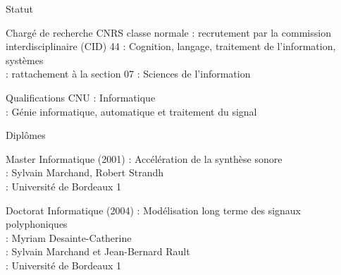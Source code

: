 \begin{frame}{Statut}
\begin{block}{Chargé de recherche CNRS classe normale}
 : recrutement par la commission interdisciplinaire (CID) 44 : \og Cognition, langage, traitement de l’information, systèmes \fg \\
 : rattachement à la section 07 : \og Sciences de l'information \fg
\end{block}
\begin{block}{Qualifications CNU}
 : \og Informatique \fg \\
 : \og Génie informatique, automatique et traitement du signal \fg
\end{block}
\end{frame}

\begin{frame}{Diplômes}
\begin{block}{Master Informatique (2001)}
 : \og Accélération de la synthèse sonore \fg \\
 : Sylvain Marchand, Robert Strandh \\
 : Université de Bordeaux 1
\end{block}
\begin{block}{Doctorat Informatique (2004)}
: \og Modélisation long terme des signaux polyphoniques \fg \\
: Myriam Desainte-Catherine \\
: Sylvain Marchand et Jean-Bernard Rault \\
: Université de Bordeaux 1
\end{block}
\end{frame}


